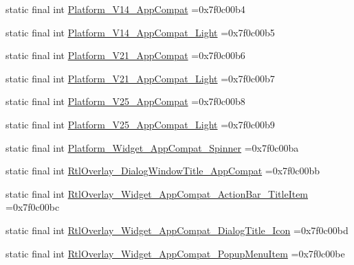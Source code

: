 \begin{DoxyCompactItemize}
\item 
static final int \mbox{\hyperlink{classbr_1_1unb_1_1cic_1_1mp_1_1marketmaster_1_1test_1_1R_1_1style_a8d5a00602b5f5e63bc36a3b1a8fdf017}{Platform\+\_\+\+V14\+\_\+\+App\+Compat}} =0x7f0c00b4
\item 
static final int \mbox{\hyperlink{classbr_1_1unb_1_1cic_1_1mp_1_1marketmaster_1_1test_1_1R_1_1style_a41b336345296ac6c2c4c71b1d6df98f1}{Platform\+\_\+\+V14\+\_\+\+App\+Compat\+\_\+\+Light}} =0x7f0c00b5
\item 
static final int \mbox{\hyperlink{classbr_1_1unb_1_1cic_1_1mp_1_1marketmaster_1_1test_1_1R_1_1style_a7127859f79111613c14a90c0e2135495}{Platform\+\_\+\+V21\+\_\+\+App\+Compat}} =0x7f0c00b6
\item 
static final int \mbox{\hyperlink{classbr_1_1unb_1_1cic_1_1mp_1_1marketmaster_1_1test_1_1R_1_1style_acaab8261c4bae7ab44d077be41013aa9}{Platform\+\_\+\+V21\+\_\+\+App\+Compat\+\_\+\+Light}} =0x7f0c00b7
\item 
static final int \mbox{\hyperlink{classbr_1_1unb_1_1cic_1_1mp_1_1marketmaster_1_1test_1_1R_1_1style_a54b7d7cc6fe02a4ca42a83730f61773b}{Platform\+\_\+\+V25\+\_\+\+App\+Compat}} =0x7f0c00b8
\item 
static final int \mbox{\hyperlink{classbr_1_1unb_1_1cic_1_1mp_1_1marketmaster_1_1test_1_1R_1_1style_a1b35e5ca0dce9f53059e2cc5c81e495d}{Platform\+\_\+\+V25\+\_\+\+App\+Compat\+\_\+\+Light}} =0x7f0c00b9
\item 
static final int \mbox{\hyperlink{classbr_1_1unb_1_1cic_1_1mp_1_1marketmaster_1_1test_1_1R_1_1style_a86f1fe3a266e9a6aa6e8a0cb2975ec6f}{Platform\+\_\+\+Widget\+\_\+\+App\+Compat\+\_\+\+Spinner}} =0x7f0c00ba
\item 
static final int \mbox{\hyperlink{classbr_1_1unb_1_1cic_1_1mp_1_1marketmaster_1_1test_1_1R_1_1style_ab9ec5fa6e98ca06882774bda4373a4ed}{Rtl\+Overlay\+\_\+\+Dialog\+Window\+Title\+\_\+\+App\+Compat}} =0x7f0c00bb
\item 
static final int \mbox{\hyperlink{classbr_1_1unb_1_1cic_1_1mp_1_1marketmaster_1_1test_1_1R_1_1style_acbfaa30dfc6e2c3369a368e8a19f7693}{Rtl\+Overlay\+\_\+\+Widget\+\_\+\+App\+Compat\+\_\+\+Action\+Bar\+\_\+\+Title\+Item}} =0x7f0c00bc
\item 
static final int \mbox{\hyperlink{classbr_1_1unb_1_1cic_1_1mp_1_1marketmaster_1_1test_1_1R_1_1style_a98027dc71bcdbac37bb130bf5fbd723c}{Rtl\+Overlay\+\_\+\+Widget\+\_\+\+App\+Compat\+\_\+\+Dialog\+Title\+\_\+\+Icon}} =0x7f0c00bd
\item 
static final int \mbox{\hyperlink{classbr_1_1unb_1_1cic_1_1mp_1_1marketmaster_1_1test_1_1R_1_1style_a1a5c8b34812bd89e678b8c1e115ba823}{Rtl\+Overlay\+\_\+\+Widget\+\_\+\+App\+Compat\+\_\+\+Popup\+Menu\+Item}} =0x7f0c00be

\end{DoxyCompactItemize}

